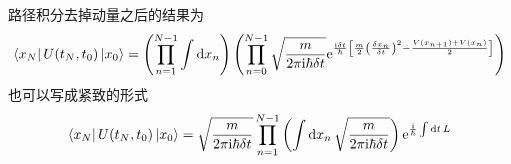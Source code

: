 \documentclass{ctexart}
\begin{document}
路径积分去掉动量之后的结果为
\begin{equation}
  \bra{x_{N}}U(t_N, t_0) \ket{x_0} = \left( \prod_{n=1}^{N-1} \int \mathrm{d} x_n \right) 
  \left( \prod_{n=0}^{N-1} \sqrt{\frac{m}{2\pi \mathrm{i} \hbar \delta t }}\mathrm{e}^{ \frac{\mathrm{i} \delta t}{\hbar}\left[ \frac{m}{2} \left( \frac{\delta x_n}{\delta t} \right) ^2 - \frac{V(x_{n+1}) + V(x_n)}{2} \right] }  \right) 
\end{equation}
也可以写成紧致的形式
\begin{equation}
  \bra{x_N}U(t_N, t_0)\ket{x_0} = \sqrt{\frac{m}{2\pi \mathrm{i}  \hbar \delta t}} \prod_{n=1}^{N-1} \left( \int\mathrm{d} x_n \, \sqrt{\frac{m}{2\pi \mathrm{i}  \hbar \delta t}} \right) \mathrm{e}^{\frac{\mathrm{i} }{\hbar}\int \mathrm{d} t \,L}
\end{equation}
\end{document}
